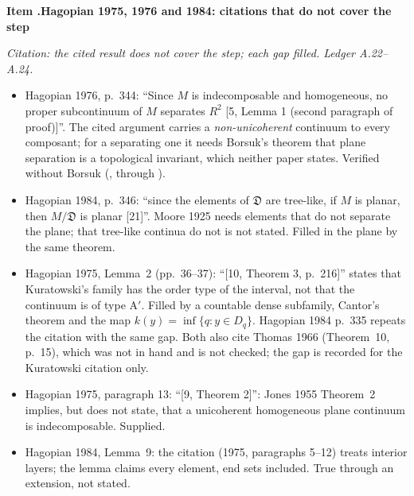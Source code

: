 \documentclass[11pt]{article}
\newcounter{defect}
\newenvironment{defect}[4]{%
  \par\addvspace{10pt}\refstepcounter{defect}%
  \noindent\textbf{Item \thedefect.\enspace #1}\par\nopagebreak
  \noindent\textit{#2}\par\nopagebreak\smallskip}{\par\addvspace{6pt}}
\begin{document}
\begin{defect}{Hagopian 1975, 1976 and 1984: citations that do not cover the step}{Citation:
the cited result does not cover the step; each gap filled. Ledger A.22--A.24.}{0}{0}\label{it:hag-cite}
\begin{itemize}
\item Hagopian 1976, p.~344: ``Since $M$ is indecomposable and homogeneous, no proper subcontinuum
  of $M$ separates $R^2$ [5, Lemma 1 (second paragraph of proof)]''. The cited argument carries a
  \emph{non-unicoherent} continuum to every composant; for a separating one it needs Borsuk's
  theorem that plane separation is a topological invariant, which neither paper states. Verified
  without Borsuk (, through
  ).
\item Hagopian 1984, p.~346: ``since the elements of $\mathfrak D$ are tree-like, if $M$ is planar,
  then $M/\mathfrak D$ is planar [21]''. Moore 1925 needs elements that do not separate the plane;
  that tree-like continua do not is not stated. Filled in the plane by the same theorem.
\item Hagopian 1975, Lemma~2 (pp.~36--37): ``[10, Theorem 3, p.~216]'' states that Kuratowski's
  family has the order type of the interval, not that the continuum is of type A$'$. Filled by a
  countable dense subfamily, Cantor's theorem and the map $k(y)=\inf\{q:y\in D_q\}$. Hagopian 1984
  p.~335 repeats the citation with the same gap. Both also cite Thomas 1966 (Theorem~10, p.~15),
  which was not in hand and is not checked; the gap is recorded for the Kuratowski citation only.
\item Hagopian 1975, paragraph 13: ``[9, Theorem 2]'': Jones 1955 Theorem~2 implies, but does not
  state, that a unicoherent homogeneous plane continuum is indecomposable. Supplied.
\item Hagopian 1984, Lemma~9: the citation (1975, paragraphs 5--12) treats interior layers; the
  lemma claims every element, end sets included. True through an extension, not stated.
\end{itemize}
\end{defect}
\end{document}
